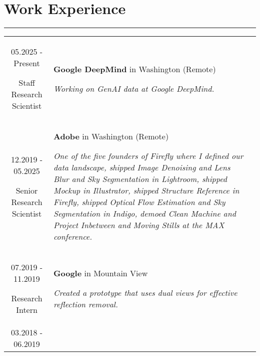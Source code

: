 \documentclass[10pt]{article}
\begin{document}
\section*{Work Experience}
\vspace{-0.3cm}
{\color{E6E6E6} \hrule height 0.04cm}
\vspace{0.4cm}
\renewcommand{\arraystretch}{1.0}
\begin{tabular}{C Z D}
	{
		05.2025 - Present
		
		\vspace{-0.05cm}
		
		{\scriptsize Staff Research Scientist}
	}
	&
	{	
		{\bf Google DeepMind} {\scriptsize in Washington (Remote)}
		
		\vspace{0.05cm}
		
		{\scriptsize \it Working on GenAI data at Google DeepMind.}
		
		\vspace{0.0cm}
	}
	\\
	{
		12.2019 - 05.2025
		
		\vspace{-0.05cm}
		
		{\scriptsize Senior Research Scientist}
	}
	&
	{	
		{\bf Adobe} {\scriptsize in Washington (Remote)}
		
		\vspace{0.05cm}
		
		{\scriptsize \it One of the five founders of Firefly where I defined our data landscape, shipped Image Denoising and Lens Blur and Sky Segmentation in Lightroom, shipped Mockup in Illustrator, shipped Structure Reference in Firefly, shipped Optical Flow Estimation and Sky Segmentation in Indigo, demoed Clean Machine and Project Inbetween and Moving Stills at the MAX conference.}
		
		\vspace{0.0cm}
	}
	\\
	{
		07.2019 - 11.2019
		
		\vspace{-0.05cm}
		
		{\scriptsize Research Intern}
	}
	&
	{	
		{\bf Google} {\scriptsize in Mountain View}
		
		\vspace{0.05cm}
		
		{\scriptsize \it Created a prototype that uses dual views for effective reflection removal.}
		
		\vspace{0.0cm}
	}
	\\
	{
		03.2018 - 06.2019
		
}
\end{tabular}
\end{document}
